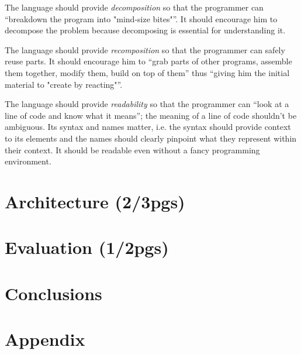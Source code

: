 \documentclass{./llncs2e/llncs}
\begin{document}
The language should provide \emph{decomposition} so that the programmer can ``breakdown the program into "mind-size bites"''. It should encourage him to decompose the problem because decomposing is essential for understanding it.

The language should provide \emph{recomposition} so that the programmer can safely reuse parts. It should encourage him to ``grab parts of other programs, assemble them together, modify them, build on top of them'' thus ``giving him the initial material to "create by reacting"''.

The language should provide \emph{readability} so that the programmer can ``look at a line of code and know what it means''; the meaning of a line of code shouldn't be ambiguous. Its syntax and names matter, i.e. the syntax should provide context to its elements and the names should clearly pinpoint what they represent within their context. It should be readable even without a fancy programming environment.


\section{Architecture (2/3pgs)}

\section{Evaluation (1/2pgs)}

\section{Conclusions}

\newpage
\appendix
\section{Appendix}
\label{sec:attachments}


% 
% 
 

 
\end{document}
